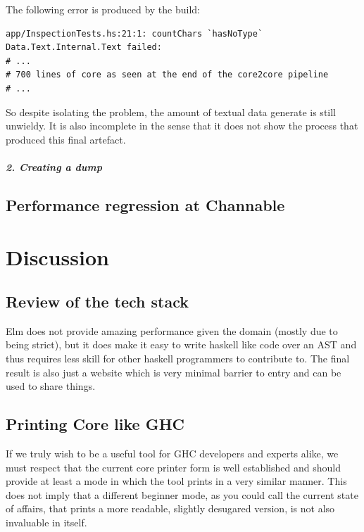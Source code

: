 \documentclass{report}
\begin{document}
The following error is produced by the build:

\begin{verbatim}
app/InspectionTests.hs:21:1: countChars `hasNoType` Data.Text.Internal.Text failed:
# ...
# 700 lines of core as seen at the end of the core2core pipeline
# ...
\end{verbatim}

So despite isolating the problem, the amount of textual data generate is still unwieldy.
It is also incomplete in the sense that it does not show the process that produced this final
artefact.

\paragraph{2. Creating a dump}




\section{Performance regression at Channable}

%


\chapter{Discussion}

\section{Review of the tech stack}
Elm does not provide amazing performance given the domain (mostly due to being strict),
but it does make it easy to write haskell like code over an AST and thus requires less skill
for other haskell programmers to contribute to. The final result is also just a website which is
very minimal barrier to entry and can be used to share things.

\section{Printing Core like GHC}
If we truly wish to be a useful tool for GHC developers and experts alike, we must respect
that the current core printer form is well established and should provide at least a mode in which
the tool prints in a very similar manner. This does not imply that a different beginner mode, as you
could call the current state of affairs, that prints a more readable, slightly desugared version, 
is not also invaluable in itself.
\end{document}
